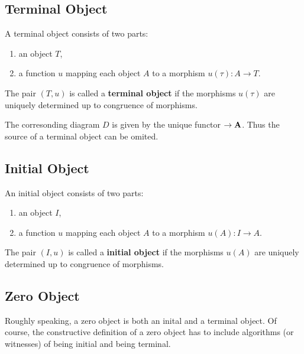 \subsection{Terminal Object}

\begin{definition}
 A terminal object consists of two parts:
 \begin{enumerate}
  \item an object $T$,
  \item a function $u$ mapping each object $A$ to a morphism $u( \tau ): A \rightarrow T$.
 \end{enumerate}
 The pair $( T, u )$ is called a \textbf{terminal object} if the morphisms $u( \tau )$ are uniquely determined up to
 congruence of morphisms.
\end{definition}

\begin{remark}
 The corresonding diagram $D$ is given by the unique functor $\empty \rightarrow \mathbf{A}$.
 Thus the source of a terminal object can be omited.
\end{remark}

\subsection{Initial Object}

\begin{definition}
 An initial object consists of two parts:
 \begin{enumerate}
  \item an object $I$,
  \item a function $u$ mapping each object $A$ to a morphism $u( A ): I \rightarrow A$.
 \end{enumerate}
  The pair $(I,u)$ is called a \textbf{initial object} if the morphisms $u(A)$ are uniquely determined up to
 congruence of morphisms.
\end{definition}

\subsection{Zero Object}

Roughly speaking, a zero object is both an inital and a terminal object.
Of course, the constructive definition of a zero object has to include
algorithms (or witnesses) of being initial and being terminal.

